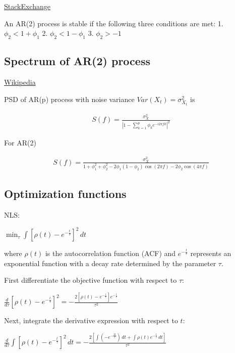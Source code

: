\documentclass[latex/main.tex]{subfiles}
\begin{document}
\href{https://stats.stackexchange.com/questions/118019/a-proof-for-the-stationarity-of-an-ar2}{StackExchange}

An AR(2) process is stable if the following three conditions are met:
1. $\phi_2 < 1 + \phi_1$
2. $\phi_2 < 1 - \phi_1$
3. $\phi_2 > -1$

\subsection{Spectrum of AR(2) process}

\href{https://en.wikipedia.org/wiki/Autoregressive_model#Spectrum}{Wikipedia}

PSD of AR(p) process with noise variance $Var(X_t) = \sigma^2_{X_t}$ is

\begin{align*}
S(f) = \frac{\sigma^2_X}{|1 - \sum_{k=1}^p \phi_k e^{-i2\pi fk}|^2}
\end{align*}

For AR(2)

\begin{align*}
S(f) = \frac{\sigma^2_X}{1 + \phi_1^2 + \phi_2^2 - 2\phi_1(1 - \phi_2)\cos(2\pi f) - 2\phi_2\cos(4\pi f)}
\end{align*}

\subsection{Optimization functions}

NLS:

$\min_{\tau} \int \left[ \rho(t) - e^{-\frac{t}{\tau}} \right]^2 \, dt$  

where $\rho(t)$ is the autocorrelation function (ACF) and $e^{-\frac{t}{\tau}}$ represents an exponential function with a decay rate determined by the parameter $\tau$.

First differentiate the objective function with respect to $\tau$:  

$\frac{d}{d\tau} \left[ \rho(t) - e^{-\frac{t}{\tau}} \right]^2 = - \frac{2 \left[\rho{\left(t \right)} - e^{- \frac{t}{\tau}}\right] e^{- \frac{t}{\tau}}}{\tau^{2}}$  

Next, integrate the derivative expression with respect to $t$:  

$\frac{d}{d\tau} \int \left[ \rho(t) - e^{-\frac{t}{\tau}} \right]^2 \, dt = - \frac{2 \left[\int \left(- e^{- \frac{2 t}{\tau}}\right)\, dt + \int \rho{\left(t \right)} e^{- \frac{t}{\tau}}\, dt\right]}{\tau^{2}}$
\end{document}
